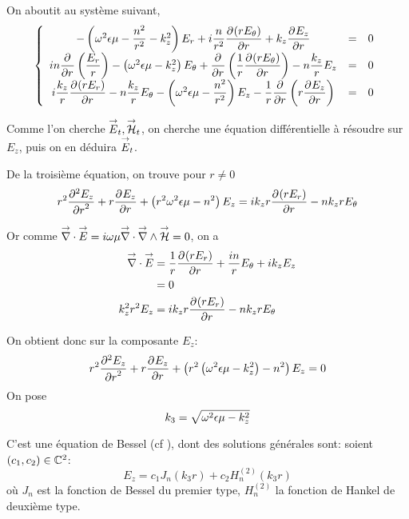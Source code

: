     On aboutit au système suivant,
    \begin{equation}
        \left\lbrace
        \begin{array}{ccc}
            -\left(\w^2\eps\mu -\frac{n^2}{r^2}  - k_z^2\right)E_r  +i\frac{n}{r^2}\ddr{r}{(rE_\theta)}  +k_z\ddr{r}{E_z} & = & 0\\
            in\ddr{r}{}\left(\frac{E_r}{r}\right) -\left(\w^2\eps\mu - k_z^2\right)E_\theta + \ddr{r}{}\left(\frac{1}{r}\ddr{r}{(rE_\theta)}\right)  - n\frac{k_z}{r}E_z & = & 0\\
            i\frac{k_z}{r}\ddr{r}{(rE_r)}  - n\frac{k_z}{r}E_\theta  -\left(\w^2\eps\mu - \frac{n^2}{r^2} \right)E_z - \frac{1}{r}\ddr{r}{}\left(r\ddr{r}{E_z}\right) & = & 0
        \end{array}
        \right.
    \end{equation}

    Comme l'on cherche $\vE_t, \vH_t$, on cherche une équation différentielle à résoudre sur $E_z$, puis on en déduira $\vE_t$.

    De la troisième  équation, on trouve pour $r\not=0$
    \begin{equation}
    r^2 \ddr[2]{r}{E_z} + r\ddr{r}{E_z} + \left(r^2\w^2\eps\mu - n^2\right)E_z =ik_zr\ddr{r}{(rE_r)} -  nk_zrE_\theta
    \end{equation}


    Or comme $\vdiv \vE = i\w\mu\vdiv\vrot\vH = 0$, on a
    \begin{align}
        \vdiv\vE &= \frac{1}{r}\ddr{r}{(rE_r)} + \frac{in}{r}E_\theta + ik_zE_z
        \\
        &=0
        \\
        k_z^2r^2 E_z &= ik_zr\ddr{r}{(rE_r)} - nk_zrE_\theta
    \end{align}

    On obtient donc sur la composante $E_z$:
    \begin{equation}
        r^2 \ddr[2]{r}{E_z} + r\ddr{r}{E_z} + \left(r^2\left(\w^2\eps\mu - k_z^2\right) - n^2\right)E_z = 0
    \end{equation}
    On pose 
    \begin{equation}
        k_3 = \sqrt{\w^2\eps\mu - k_z^2}
    \end{equation}

    C'est une équation de Bessel (cf \cite[eq (6.80)]{bowman_introduction_1958}), dont des solutions générales sont: soient $(c_1,c_2) \in \CC^2$:
    \begin{equation}
        E_z = c_1 J_n\left(k_3r\right) + c_2 H_n^{(2)}\left(k_3r\right)
    \end{equation}
    où $J_n$ est la fonction de Bessel du premier type, $H_n^{(2)}$ la fonction de Hankel de deuxième type. 

